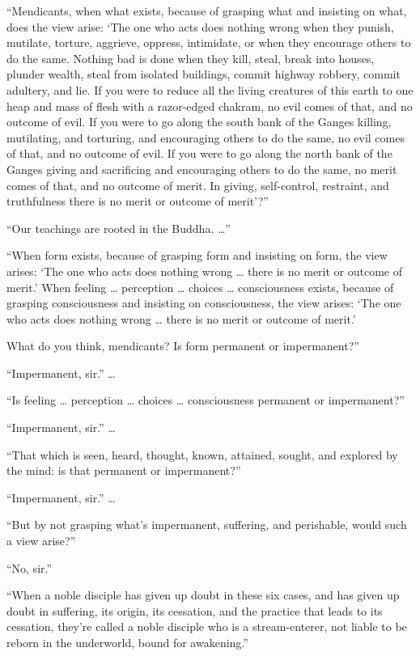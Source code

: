 \documentclass[12pt,openany]{book}%
\begin{document}
“Mendicants, when what exists, because of grasping what and insisting on what, does the view arise: ‘The one who acts does nothing wrong when they punish, mutilate, torture, aggrieve, oppress, intimidate, or when they encourage others to do the same. Nothing bad is done when they kill, steal, break into houses, plunder wealth, steal from isolated buildings, commit highway robbery, commit adultery, and lie. If you were to reduce all the living creatures of this earth to one heap and mass of flesh with a razor-edged chakram, no evil comes of that, and no outcome of evil. If you were to go along the south bank of the Ganges killing, mutilating, and torturing, and encouraging others to do the same, no evil comes of that, and no outcome of evil. If you were to go along the north bank of the Ganges giving and sacrificing and encouraging others to do the same, no merit comes of that, and no outcome of merit. In giving, self-control, restraint, and truthfulness there is no merit or outcome of merit’?” 

“Our teachings are rooted in the Buddha. …” 

“When form exists, because of grasping form and insisting on form, the view arises: ‘The one who acts does nothing wrong … there is no merit or outcome of merit.’ When feeling … perception … choices … consciousness exists, because of grasping consciousness and insisting on consciousness, the view arises: ‘The one who acts does nothing wrong … there is no merit or outcome of merit.’ 

What do you think, mendicants? Is form permanent or impermanent?” 

“Impermanent, sir.” … 

“Is feeling … perception … choices … consciousness permanent or impermanent?” 

“Impermanent, sir.” … 

“That which is seen, heard, thought, known, attained, sought, and explored by the mind: is that permanent or impermanent?” 

“Impermanent, sir.” … 

“But by not grasping what’s impermanent, suffering, and perishable, would such a view arise?” 

“No, sir.” 

“When a noble disciple has given up doubt in these six cases, and has given up doubt in suffering, its origin, its cessation, and the practice that leads to its cessation, they’re called a noble disciple who is a stream-enterer, not liable to be reborn in the underworld, bound for awakening.” 
\end{document}
